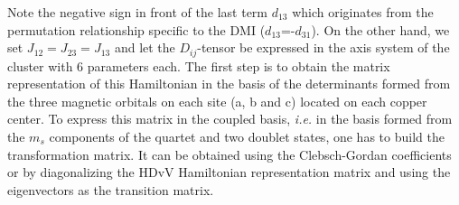\documentclass[12pt,a4paper]{report}
\numberwithin{equation}{section}
\begin{document}
Note the negative sign in front of the last term $d_{13}$ which originates from the permutation relationship specific to the DMI ($d_{13}$=-$d_{31}$).
On the other hand, we set $J_{12}=J_{23}=J_{13}$ and let the $D_{ij}$-tensor be expressed in the axis system of the cluster with 6 parameters each.
The first step is to obtain the matrix representation of this Hamiltonian in the basis of the determinants formed from the three magnetic orbitals on each site (a, b and c) located on each copper center.
To express this matrix in the coupled basis, \textit{i.e.} in the basis formed from the $m_s$ components of the quartet and two doublet states, one has to build the transformation matrix.
It can be obtained using the Clebsch-Gordan coefficients or by diagonalizing the HDvV Hamiltonian representation matrix and using the eigenvectors as the transition matrix.
\end{document}
